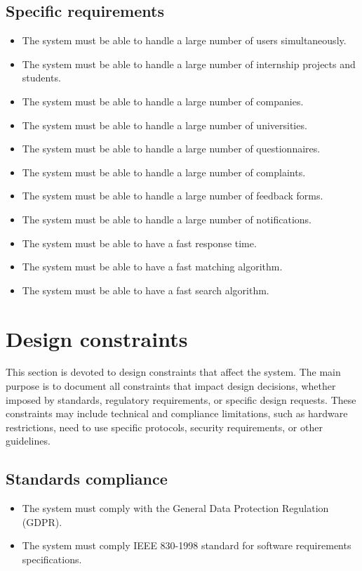 \subsection{Specific requirements}
\begin{itemize}
    \item The system must be able to handle a large number of users simultaneously.
    \item The system must be able to handle a large number of internship projects and students.
    \item The system must be able to handle a large number of companies.
    \item The system must be able to handle a large number of universities.
    \item The system must be able to handle a large number of questionnaires.
    \item The system must be able to handle a large number of complaints.
    \item The system must be able to handle a large number of feedback forms.
    \item The system must be able to handle a large number of notifications.
    \item The system must be able to have a fast response time.
    \item The system must be able to have a fast matching algorithm.
    \item The system must be able to have a fast search algorithm.
\end{itemize}

\section{Design constraints}
    
This section is devoted to design constraints that affect the system. 
    The main purpose is to document all constraints that impact design decisions, whether imposed by standards, 
    regulatory requirements, or specific design requests. 
    These constraints may include technical and compliance limitations, such as hardware restrictions, 
    need to use specific protocols, security requirements, or other guidelines.

    
\subsection{Standards compliance}
    \begin{itemize}
        \item The system must comply with the General Data Protection Regulation (GDPR).
        \item The system must comply IEEE 830-1998 standard for software requirements specifications.
    \end{itemize}
    
